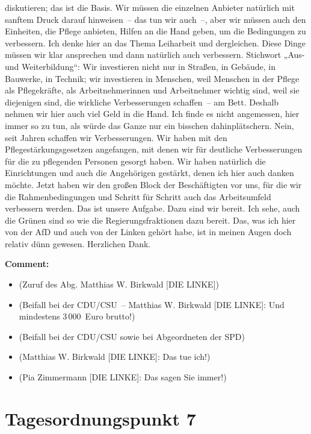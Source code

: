 \documentclass{article}
\begin{document}
diskutieren; das ist die Basis. Wir müssen die einzelnen Anbieter natürlich mit sanftem Druck darauf hinweisen – das tun wir auch –, aber wir müssen auch den Einheiten, die Pflege anbieten, Hilfen an die Hand geben, um die Bedingungen zu verbessern. Ich denke hier an das Thema Leiharbeit und dergleichen. Diese Dinge müssen wir klar ansprechen und dann natürlich auch verbessern. Stichwort „Aus- und Weiterbildung“: Wir investieren nicht nur in Straßen, in Gebäude, in Bauwerke, in Technik; wir investieren in Menschen, weil Menschen in der Pflege als Pflegekräfte, als Arbeitnehmerinnen und Arbeitnehmer wichtig sind, weil sie diejenigen sind, die wirkliche Verbesserungen schaffen – am Bett. Deshalb nehmen wir hier auch viel Geld in die Hand. Ich finde es nicht angemessen, hier immer so zu tun, als würde das Ganze nur ein bisschen dahinplätschern. Nein, seit Jahren schaffen wir Verbesserungen. Wir haben mit den Pflegestärkungsgesetzen angefangen, mit denen wir für deutliche Verbesserungen für die zu pflegenden Personen gesorgt haben. Wir haben natürlich die Einrichtungen und auch die Angehörigen gestärkt, denen ich hier auch danken möchte. Jetzt haben wir den großen Block der Beschäftigten vor uns, für die wir die Rahmenbedingungen und Schritt für Schritt auch das Arbeitsumfeld verbessern werden. Das ist unsere Aufgabe. Dazu sind wir bereit. Ich sehe, auch die Grünen sind so wie die Regierungsfraktionen dazu bereit. Das, was ich hier von der AfD und auch von der Linken gehört habe, ist in meinen Augen doch relativ dünn gewesen. Herzlichen Dank. 

\noindent\textbf{Comment:}
\begin{itemize}
    \setlength\itemsep{-3pt}
    \item (Zuruf des Abg. Matthias W. Birkwald [DIE LINKE])
    \setlength\itemsep{-3pt}
    \item (Beifall bei der CDU/CSU – Matthias W. Birkwald [DIE LINKE]: Und mindestens 3 000 Euro brutto!)
    \setlength\itemsep{-3pt}
    \item (Beifall bei der CDU/CSU sowie bei Abgeordneten der SPD)
    \setlength\itemsep{-3pt}
    \item (Matthias W. Birkwald [DIE LINKE]: Das tue ich!)
    \setlength\itemsep{-3pt}
    \item (Pia Zimmermann [DIE LINKE]: Das sagen Sie immer!)
\end{itemize}
\section{Tagesordnungspunkt 7}
\end{document}
